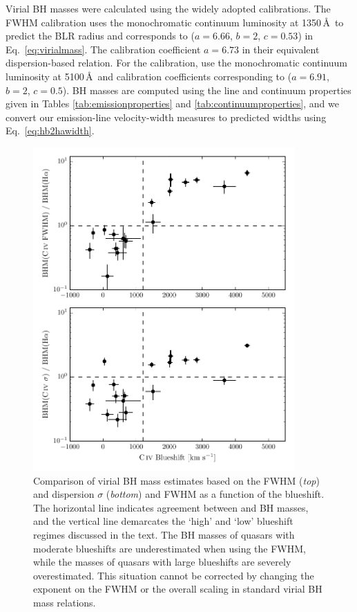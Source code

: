 Virial BH masses were calculated using the widely adopted \citet{vestergaard06} calibrations. 
The \citet{vestergaard06}  FWHM calibration uses the monochromatic continuum luminosity at 1350\,\AA\, to predict the BLR radius and corresponds to ($a=6.66$, $b=2$, $c=0.53$) in Eq.~\ref{eq:virialmass}. 
The calibration coefficient $a=6.73$ in their equivalent dispersion-based relation. 
For the \hb calibration, \citet{vestergaard06} use the monochromatic continuum luminosity at 5100\,\AA\, and calibration coefficients corresponding to ($a=6.91$, $b=2$, $c=0.5$).
BH masses are computed using the line and continuum properties given in Tables \ref{tab:emissionproperties} and \ref{tab:continuumproperties}, and we convert our \ha emission-line velocity-width measures to predicted \hb widths using Eq.~\ref{eq:hb2hawidth}.

\begin{figure}
    \includegraphics[width=10cm]{figures/chapter02/bs_bhm.pdf}
    \caption{Comparison of virial BH mass estimates based on the  FWHM ({\it top}) and dispersion $\sigma$ ({\it bottom}) and \ha FWHM as a function of the  blueshift. The horizontal line indicates agreement between  and \ha BH masses, and the vertical line demarcates the `high' and `low'  blueshift regimes discussed in the text. The BH masses of quasars with moderate  blueshifts are underestimated when using the  FWHM, while the masses of quasars with large blueshifts are severely overestimated. This situation cannot be corrected by changing the exponent on the FWHM \citep[e.g.][]{rafiee11,park13} or the overall scaling in standard virial BH mass relations.}
    \label{fig:bhm_blueshift}
\end{figure}

